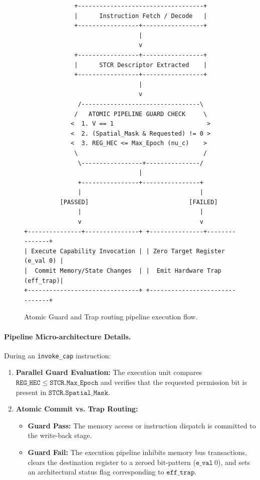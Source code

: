 \begin{figure}[h]
\centering
\begin{verbatim}
              +-----------------------------------+
              |      Instruction Fetch / Decode   |
              +-----------------+-----------------+
                                |
                                v
              +-----------------+-----------------+
              |      STCR Descriptor Extracted    |
              +-----------------+-----------------+
                                |
                                v
               /---------------------------------\
              /   ATOMIC PIPELINE GUARD CHECK     \
             <  1. V == 1                          >
             <  2. (Spatial_Mask & Requested) != 0 >
             <  3. REG_HEC <= Max_Epoch (nu_c)    >
              \                                   /
               \-----------------+---------------/
                                |
               +----------------+----------------+
               |                                 |
          [PASSED]                            [FAILED]
               |                                 |
               v                                 v
+---------------+---------------+ +---------------+---------------+
| Execute Capability Invocation | | Zero Target Register (e_val 0) |
|  Commit Memory/State Changes  | |  Emit Hardware Trap (eff_trap)|
+-------------------------------+ +-------------------------------+
\end{verbatim}
\caption{Atomic Guard and Trap routing pipeline execution flow.}
\label{fig:pipeline_trap}
\end{figure}

\paragraph{Pipeline Micro-architecture Details.}
During an \texttt{invoke\_cap} instruction:
\begin{enumerate}
    \item \textbf{Parallel Guard Evaluation:} The execution unit compares $\mathtt{REG\_HEC} \le \mathtt{STCR.Max\_Epoch}$ and verifies that the requested permission bit is present in $\mathtt{STCR.Spatial\_Mask}$.
    \item \textbf{Atomic Commit vs. Trap Routing:}
    \begin{itemize}
        \item \textbf{Guard Pass:} The memory access or instruction dispatch is committed to the write-back stage.
        \item \textbf{Guard Fail:} The execution pipeline inhibits memory bus transactions, clears the destination register to a zeroed bit-pattern ($\mathtt{e\_val}~0$), and sets an architectural status flag corresponding to $\mathtt{eff\_trap}$.
    \end{itemize}
\end{enumerate}

